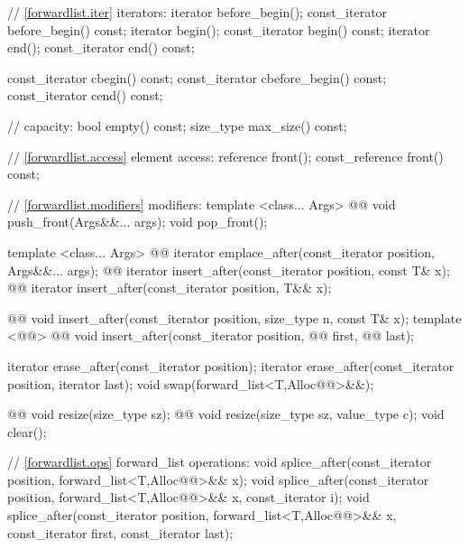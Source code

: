 \documentclass[american,twoside]{book}
\begin{document}
\begin{codeblock}
{{    // \ref{forwardlist.iter} iterators:
    iterator before_begin();
    const_iterator before_begin() const;
    iterator begin(); 
    const_iterator begin() const; 
    iterator end(); 
    const_iterator end() const;

    const_iterator cbegin() const;
    const_iterator cbefore_begin() const;
    const_iterator cend() const;

    // capacity: 
    bool empty() const; 
    size_type max_size() const;

    // \ref{forwardlist.access} element access: 
    reference front(); 
    const_reference front() const; 

    // \ref{forwardlist.modifiers} modifiers: 
    template <class... Args> 
      @@ 
      void push_front(Args&&... args); 
    void pop_front();
   
    template <class... Args> 
      @@ 
      iterator emplace_after(const_iterator position, Args&&... args);
    @@ 
      iterator insert_after(const_iterator position, const T& x);
    @@ 
      iterator insert_after(const_iterator position, T&& x);

    @@ 
      void insert_after(const_iterator position, size_type n, const T& x); 
    template <@@> 
      @@
      void insert_after(const_iterator position, @@ first, @@ last);

    iterator erase_after(const_iterator position); 
    iterator erase_after(const_iterator position, iterator last); 
    void swap(forward_list<T,Alloc@@>&&);

    @@ void resize(size_type sz);
    @@ void resize(size_type sz, value_type c);
    void clear(); 

    // \ref{forwardlist.ops} forward_list operations: 
    void splice_after(const_iterator position, forward_list<T,Alloc@@>&& x); 
    void splice_after(const_iterator position, forward_list<T,Alloc@@>&& x,
                      const_iterator i); 
    void splice_after(const_iterator position, forward_list<T,Alloc@@>&& x,
                      const_iterator first, const_iterator last); 

}}
\end{codeblock}
\end{document}
